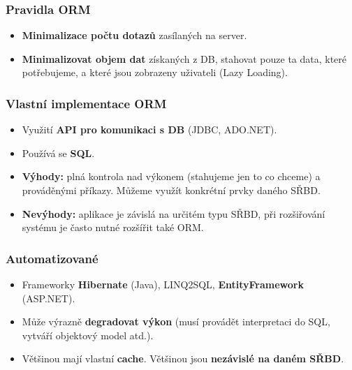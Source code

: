 \subsubsection{Pravidla ORM}
\begin{itemize}
\item \textbf{Minimalizace počtu dotazů }zasílaných na server.
\item \textbf{Minimalizovat objem dat} získaných z DB, stahovat pouze ta data, které potřebujeme, a které jsou zobrazeny uživateli (Lazy Loading).
\end{itemize}

\subsubsection{Vlastní implementace ORM}
\begin{itemize}
\item Využití \textbf{API pro komunikaci s DB} (JDBC, ADO.NET).
\item Používá se \textbf{SQL}.
\item \textbf{Výhody:} plná kontrola nad výkonem (stahujeme jen to co chceme) a prováděnými příkazy. Můžeme využít konkrétní prvky daného SŘBD.
\item \textbf{Nevýhody:} aplikace je závislá na určitém typu SŘBD, při rozšiřování systému je často nutné rozšířit také ORM.
\end{itemize}

\subsubsection{Automatizované}
\begin{itemize}
\item Frameworky \textbf{Hibernate} (Java), LINQ2SQL, \textbf{EntityFramework} (ASP.NET).
\item Může výrazně \textbf{degradovat výkon} (musí provádět interpretaci do SQL, vytváří objektový model atd.).
\item Většinou mají vlastní \textbf{cache}. Většinou jsou \textbf{nezávislé na daném SŘBD}.
\end{itemize}

